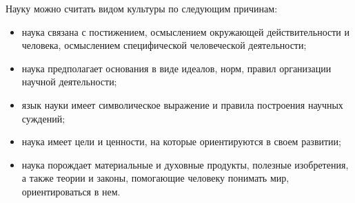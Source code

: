 




Науку можно считать видом культуры по следующим причинам:
\begin{itemize}
    \item наука связана с постижением, осмыслением окружающей действительности и человека, осмыслением специфической человеческой деятельности;
    \item наука предполагает основания в виде идеалов, норм, правил организации
    научной деятельности;
    \item язык науки имеет символическое выражение и правила построения научных суждений;
    \item наука имеет цели и ценности, на которые ориентируются в своем развитии;
    \item наука порождает материальные и духовные продукты, полезные изобретения, а также теории и законы, помогающие человеку понимать мир, ориентироваться в нем.
\end{itemize}

